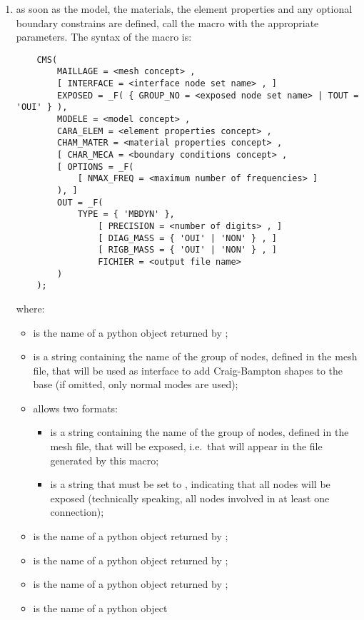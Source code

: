\begin{enumerate}
\item as soon as the model, the materials, the element properties
and any optional boundary constrains are defined,
call the  macro with the appropriate parameters.
The syntax of the macro is:
\begin{verbatim}
    CMS(
        MAILLAGE = <mesh concept> ,
        [ INTERFACE = <interface node set name> , ]
        EXPOSED = _F( { GROUP_NO = <exposed node set name> | TOUT = 'OUI' } ),
        MODELE = <model concept> ,
        CARA_ELEM = <element properties concept> ,
        CHAM_MATER = <material properties concept> ,
        [ CHAR_MECA = <boundary conditions concept> ,
        [ OPTIONS = _F(
            [ NMAX_FREQ = <maximum number of frequencies> ]
        ), ]
        OUT = _F(
            TYPE = { 'MBDYN' },
                [ PRECISION = <number of digits> , ]
                [ DIAG_MASS = { 'OUI' | 'NON' } , ]
                [ RIGB_MASS = { 'OUI' | 'NON' } , ]
                FICHIER = <output file name> 
        )
    );
\end{verbatim}
where:
\begin{itemize}
\item {} is the name of a python object
	returned by ;
\item {} is a string containing the name of the group of nodes,
	defined in the mesh file, that will be used as interface
	to add Craig-Bampton shapes to the base
	(if omitted, only normal modes are used);
\item {} allows two formats:
	\begin{itemize}
	\item {} is a string containing the name
		of the group of nodes, defined in the mesh file,
		that will be exposed, i.e.\ that will appear
		in the  file generated by this macro;
	\item {} is a string that must be set to ,
		indicating that all nodes will be exposed
		(technically speaking, all nodes involved
		in at least one connection);
	\end{itemize}
\item {} is the name of a python object
	returned by ;
\item {} is the name of a python object
	returned by ;
\item {} is the name of a python object
	returned by ;
\item {} is the name of a python object

\end{itemize}
\end{enumerate}
